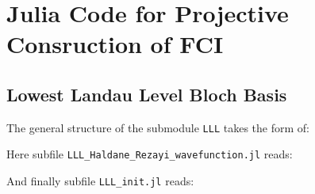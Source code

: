 \chapter{Julia Code for Projective Consruction of FCI}

\section{Lowest Landau Level Bloch Basis}
The general structure of the submodule \texttt{LLL} takes the form of:


\noindent Here subfile \texttt{LLL\_Haldane\_Rezayi\_wavefunction.jl} reads:


\noindent And finally subfile \texttt{LLL\_init.jl} reads:

